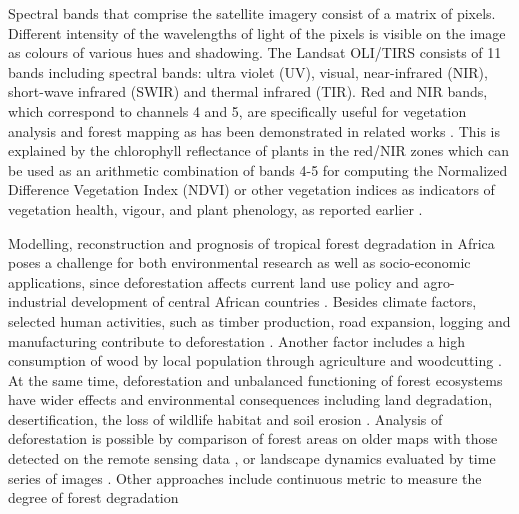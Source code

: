 \documentclass[applsci,article,submit,pdftex,moreauthors]{Definitions/mdpi}
\begin{document}
Spectral bands that comprise the satellite imagery consist of a matrix of pixels. Different intensity of the wavelengths of light of the pixels is visible on the image as colours of various hues and shadowing. The Landsat OLI/TIRS consists of 11 bands including spectral bands: ultra violet (UV), visual, near-infrared (NIR), short-wave infrared (SWIR) and thermal infrared (TIR). Red and NIR bands, which correspond to channels 4 and 5, are specifically useful for vegetation analysis and forest mapping as has been demonstrated in related works \cite{DALPONTE2020102206,HUANG2022100006,WANG2022113021}. This is explained by the chlorophyll reflectance of plants in the red/NIR zones which can be used as an arithmetic combination of bands 4-5 for computing the Normalized Difference Vegetation Index (NDVI) \cite{HUETE2002195} or other vegetation indices \cite{
JIANG20083833,HUETE1988295} as indicators of vegetation health, vigour, and plant phenology, as reported earlier \cite{SOUDANI2012234,Lemenkova202019,1026428,HMIMINA2013145}.

Modelling, reconstruction and prognosis of tropical forest degradation in Africa poses a challenge for both environmental research as well as socio-economic applications, since deforestation affects current land use policy and agro-industrial development of central African countries \cite{TEGEGNE2016312,f13091508}. Besides climate factors, selected human activities, such as timber production, road expansion, logging and manufacturing contribute to deforestation \cite{BRANDT201615,TRITSCH2020106660,Lietal2015}. Another factor includes a high consumption of wood by local population through agriculture and woodcutting \cite{Iloweka}. At the same time, deforestation and unbalanced functioning of forest ecosystems have wider effects and environmental consequences including land degradation, desertification, the loss of wildlife habitat and soil erosion \cite{AQUILAS2022100553}. Analysis of deforestation is possible by comparison of forest areas on older maps with those detected on the remote sensing data \cite{rs12040638,land10101042,Zhangetal2005}, or landscape dynamics evaluated by time series of images \cite{land11091541}. Other approaches include continuous metric to measure the degree of forest degradation \cite{SHAPIRO2021107268}
 
\end{document}
